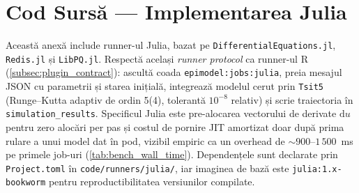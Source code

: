 \chapter{Cod Sursă — Implementarea Julia}
\label{app:cod_julia}

Această anexă include runner-ul Julia, bazat pe
\texttt{DifferentialEquations.jl}, \texttt{Redis.jl} și \texttt{LibPQ.jl}.
Respectă același \emph{runner protocol} ca runner-ul R
(\cref{subsec:plugin_contract}): ascultă coada \texttt{epimodel:jobs:julia},
preia mesajul JSON cu parametrii și starea inițială, integrează modelul cerut
prin \texttt{Tsit5} (Runge--Kutta adaptiv de ordin 5(4), tolerantă $10^{-8}$
relativ) și scrie traiectoria în \texttt{simulation\_results}. Specificul Julia
este pre-alocarea vectorului de derivate $\mathrm{d}u$ pentru zero alocări
per pas și costul de pornire JIT amortizat doar după prima rulare a unui
model dat în pod, vizibil empiric ca un overhead de $\sim$$900$--$1\,500$~ms
pe primele job-uri (\cref{tab:bench_wall_time}). Dependențele sunt
declarate prin \texttt{Project.toml} în \texttt{code/runners/julia/}, iar
imaginea de bază este \texttt{julia:1.x-bookworm} pentru reproductibilitatea
versiunilor compilate.


